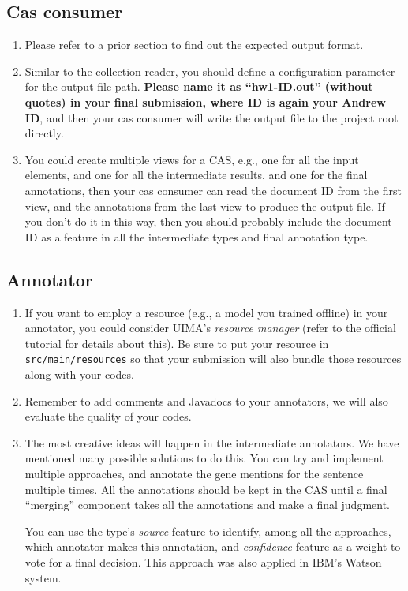 \subsection{Cas consumer}

\begin{enumerate}
  
\item Please refer to a prior section to find out the expected output format.

\item Similar to the collection reader, you should define a configuration
parameter for the output file path. \textbf{Please name it as ``hw1-ID.out''
(without quotes) in your final submission, where ID is again your Andrew ID},
and then your cas consumer will write the output file to the project root
directly.

\item You could create multiple views for a CAS, e.g., one for all the input
elements, and one for all the intermediate results, and one for the final
annotations, then your cas consumer can read the document ID from the first
view, and the annotations from the last view to produce the output file. If you
don't do it in this way, then you should probably include the document ID as a
feature in all the intermediate types and final annotation type.

\end{enumerate}

\subsection{Annotator}

\begin{enumerate}

\item If you want to employ a resource (e.g., a model you trained offline) in
your annotator, you could consider UIMA's \emph{resource manager} (refer to the
official tutorial for details about this).
Be sure to put your resource in \texttt{src/main/resources} so that your
submission will also bundle those resources along with your codes.

\item Remember to add comments and Javadocs to your annotators, we will also
evaluate the quality of your codes.

\item The most creative ideas will happen in the intermediate annotators. We
have mentioned many possible solutions to do this. You can try and implement
multiple approaches, and annotate the gene mentions for the sentence multiple
times. All the annotations should be kept in the CAS until a final ``merging''
component takes all the annotations and make a final judgment.

You can use the type's \emph{source} feature to identify, among all the
approaches, which annotator makes this annotation, and \emph{confidence} feature
as a weight to vote for a final decision. This approach was also applied in
IBM's Watson system.

\end{enumerate}
